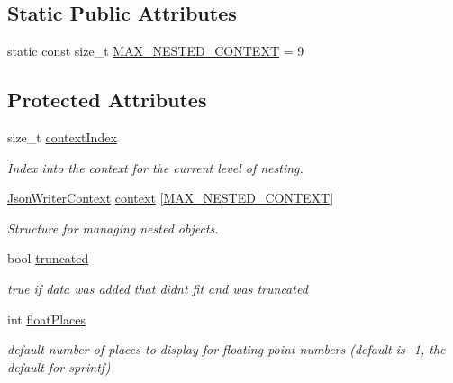 \subsection*{Static Public Attributes}
\begin{DoxyCompactItemize}
\item 
static const size\+\_\+t \hyperlink{class_json_writer_a7d1daa126e962c611373f65d1e83e4ee}{M\+A\+X\+\_\+\+N\+E\+S\+T\+E\+D\+\_\+\+C\+O\+N\+T\+E\+XT} = 9
\end{DoxyCompactItemize}
\subsection*{Protected Attributes}
\begin{DoxyCompactItemize}
\item 
size\+\_\+t \hyperlink{class_json_writer_a28554227000e3a49b446e5db77f0505e}{context\+Index}
\begin{DoxyCompactList}\small\item\em Index into the context for the current level of nesting. \end{DoxyCompactList}\item 
\hyperlink{struct_json_writer_context}{Json\+Writer\+Context} \hyperlink{class_json_writer_a2311bf4f11136f55acd23fb13b4b1344}{context} \mbox{[}\hyperlink{class_json_writer_a7d1daa126e962c611373f65d1e83e4ee}{M\+A\+X\+\_\+\+N\+E\+S\+T\+E\+D\+\_\+\+C\+O\+N\+T\+E\+XT}\mbox{]}
\begin{DoxyCompactList}\small\item\em Structure for managing nested objects. \end{DoxyCompactList}\item 
bool \hyperlink{class_json_writer_a30b9462bee5d300841630e64b660fe43}{truncated}
\begin{DoxyCompactList}\small\item\em true if data was added that didn\textquotesingle{}t fit and was truncated \end{DoxyCompactList}\item 
int \hyperlink{class_json_writer_ab0c979f74ad01b6e9970ffed5b39cb29}{float\+Places}
\begin{DoxyCompactList}\small\item\em default number of places to display for floating point numbers (default is -\/1, the default for sprintf) \end{DoxyCompactList}\end{DoxyCompactItemize}


